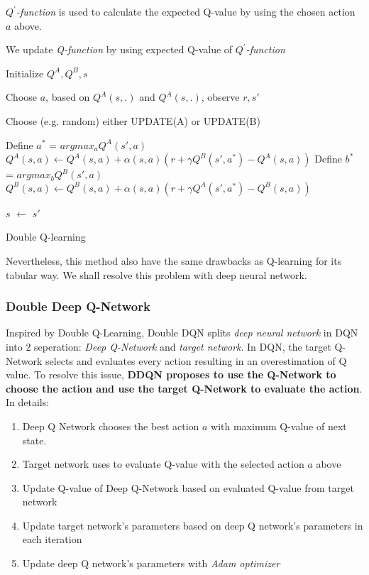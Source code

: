 \documentclass{article}
\begin{document}
\textit{$Q^{ \prime}$-function} is used to calculate the expected Q-value by using the chosen action $a$ above.

We update \textit{Q-function} by using expected Q-value of \textit{$Q^{\prime}$-function}


\begin{algorithm} 
    \SetAlgoLined
    Initialize $Q^A, Q^B, s$
    
    \Repeat{}
    {
        Choose $a$, based on $Q^A\left(s, .\right)$ and $Q^A\left(s, .\right)$, observe $r, s'$
        
        Choose (e.g. random) either UPDATE(A) or UPDATE(B)
        
        { 
            Define $a^*$ = $argmax_a Q^A\left(s', a\right)$
            $Q^A\left(s, a\right) \leftarrow Q^A\left(s, a\right) + \alpha\left(s, a\right)\left(r + \gamma Q^B\left(s', a^*\right) - Q^A\left(s, a\right)\right)$
        }
        \Else
        {
            Define $b^*$ = $argmax_b Q^B\left(s', a\right)$
            $Q^B\left(s, a\right) \leftarrow Q^B\left(s, a\right) + \alpha\left(s, a\right)\left(r + \gamma Q^A\left(s', a^*\right) - Q^B\left(s, a\right)\right)$
        }
        
        $s$ $\leftarrow$ $s'$
    }
    \caption{Double Q-learning}
\end{algorithm}


Nevertheless, this method also have the same drawbacks as Q-learning for its tabular way. We shall resolve this problem with deep neural network.
\subsubsection*{Double Deep Q-Network}
Inspired by Double Q-Learning, Double DQN splits \textit{deep neural network} in DQN into 2 seperation: \textit{Deep Q-Network} and \textit{target network}. In DQN, the target Q-Network selects and evaluates every action resulting in an overestimation of Q value. To resolve this issue, \textbf{DDQN proposes to use the Q-Network to choose the action and use the target Q-Network to evaluate the action}. In details:
\begin{enumerate}
    \item Deep Q Network chooses the best action $a$ with maximum Q-value of next state.
    \item Target network uses to evaluate Q-value with the selected action $a$ above
    \item Update Q-value of Deep Q-Network based on evaluated Q-value from target network
    \item Update target network's parameters based on deep Q network's parameters in each iteration
    \item Update deep Q network's parameters with \textit{Adam optimizer}
\end{enumerate}
\end{document}

